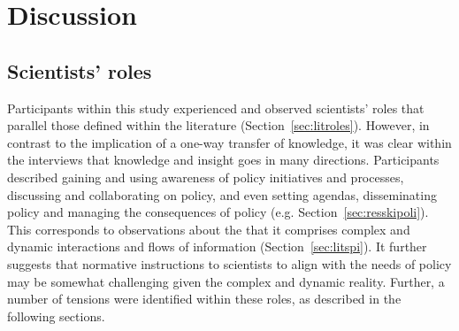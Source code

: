 \chapter{Discussion}\label{ch:discussion}


\section{Scientists' roles}\label{sec:disroles}

Participants within this study experienced and observed scientists' roles that parallel those defined within the literature (Section~\ref{sec:litroles}). However, in contrast to the implication of a one-way transfer of knowledge, it was clear within the interviews that knowledge and insight goes in many directions. Participants described gaining and using awareness of policy initiatives and processes, discussing and collaborating on policy, and even setting agendas, disseminating policy and managing the consequences of policy (e.g. Section~\ref{sec:resskipoli}). This corresponds to observations about the \SPI{} that it comprises complex and dynamic interactions and flows of information (Section~\ref{sec:litspi}). It further suggests that normative instructions to scientists to align with the needs of policy may be somewhat challenging given the complex and dynamic reality. Further, a number of tensions were identified within these roles, as described in the following sections. 

